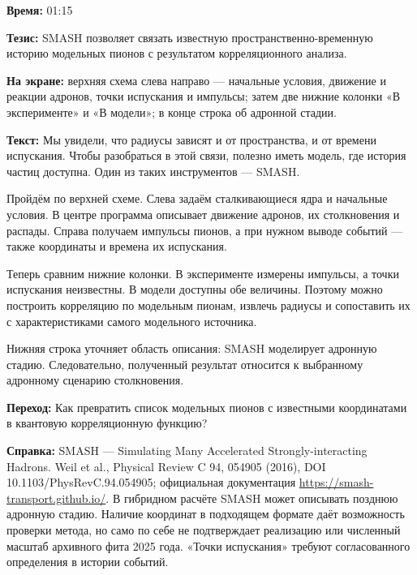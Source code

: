 \textbf{Время:} 01:15

\textbf{Тезис:} SMASH позволяет связать известную пространственно-временную историю модельных пионов с результатом корреляционного анализа.

\textbf{На экране:} верхняя схема слева направо — начальные условия, движение и реакции адронов, точки испускания и импульсы; затем две нижние колонки «В эксперименте» и «В модели»; в конце строка об адронной стадии.

\textbf{Текст:} Мы увидели, что радиусы зависят и от пространства, и от времени испускания. Чтобы разобраться в этой связи, полезно иметь модель, где история частиц доступна. Один из таких инструментов — SMASH.

Пройдём по верхней схеме. Слева задаём сталкивающиеся ядра и начальные условия. В центре программа описывает движение адронов, их столкновения и распады. Справа получаем импульсы пионов, а при нужном выводе событий — также координаты и времена их испускания.

Теперь сравним нижние колонки. В эксперименте измерены импульсы, а точки испускания неизвестны. В модели доступны обе величины. Поэтому можно построить корреляцию по модельным пионам, извлечь радиусы и сопоставить их с характеристиками самого модельного источника.

Нижняя строка уточняет область описания: SMASH моделирует адронную стадию. Следовательно, полученный результат относится к выбранному адронному сценарию столкновения.

\textbf{Переход:} Как превратить список модельных пионов с известными координатами в квантовую корреляционную функцию?

\textbf{Справка:} SMASH — Simulating Many Accelerated Strongly-interacting Hadrons. Weil et al., Physical Review C 94, 054905 (2016), DOI 10.1103/PhysRevC.94.054905; официальная документация \url{https://smash-transport.github.io/}. В гибридном расчёте SMASH может описывать позднюю адронную стадию. Наличие координат в подходящем формате даёт возможность проверки метода, но само по себе не подтверждает реализацию или численный масштаб архивного фита 2025 года. «Точки испускания» требуют согласованного определения в истории событий.
